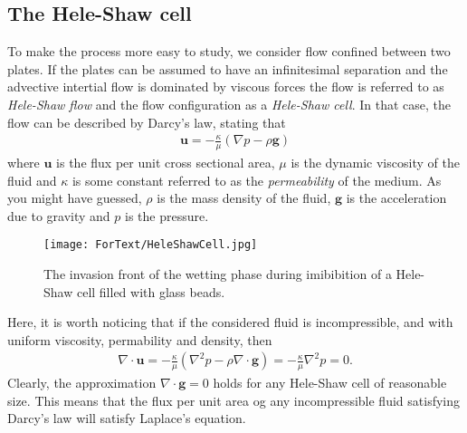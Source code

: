 \documentclass[twoside,utf8]{article}
\newcommand{\EQU}[1] { \begin{equation*} \begin{split} #1 \end{split} \end{equation*} }
\newcommand{\EQUn}[1] { \begin{equation} \begin{split} #1 \end{split} \end{equation} }
\begin{document}
\subsection{The Hele-Shaw cell}
To make the process more easy to study, we consider flow confined between two plates. If the plates can be assumed to have an infinitesimal separation and the advective intertial flow is dominated by viscous forces the flow is referred to as {\it Hele-Shaw flow} and the flow configuration as a {\it Hele-Shaw cell}. In that case, the flow can be described by Darcy's law, stating that
\EQUn{
\mathbf{u}=-\frac{\kappa}{\mu}\left( \nabla p - \rho \mathbf{g} \right) \label{eq:Darcys}
}
where $\mathbf{u}$ is the flux per unit cross sectional area, $\mu$ is the dynamic viscosity of the fluid and $\kappa$ is some constant referred to as the {\it permeability} of the medium. As you might have guessed, $\rho$ is the mass density of the fluid, $\mathbf{g}$ is the acceleration due to gravity and $p$ is the pressure.

\begin{figure}[H]
	\begin{center}
	\texttt{[image: ForText/HeleShawCell.jpg]}
	\end{center}
	\caption{The invasion front of the wetting phase during imibibition of a Hele-Shaw cell filled with glass beads. }
	\label{fig:beadsInHeleShawCell}
\end{figure}

\noindent
Here, it is worth noticing that if the considered fluid is incompressible, and with uniform viscosity, permability and density, then
\EQU{
\nabla \cdot \mathbf{u}
=-\frac{\kappa}{\mu}\left( \nabla^2 p - \rho \nabla \cdot \mathbf{g} \right)
= -\frac{\kappa}{\mu} \nabla^2 p = 0.
}
Clearly, the approximation $\nabla \cdot \mathbf{g}=0$ holds for any Hele-Shaw cell of reasonable size. This means that the flux per unit area og any incompressible fluid satisfying Darcy's law will satisfy Laplace's equation.
\end{document}
